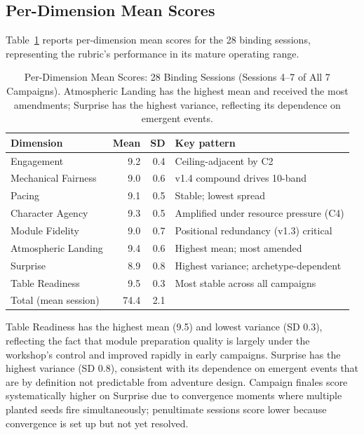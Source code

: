 \subsection{Per-Dimension Mean Scores}

Table~\ref{tab:dimension-means} reports per-dimension mean scores for the 28 binding
sessions, representing the rubric's performance in its mature operating range.

\begin{table}[t]
\caption{Per-Dimension Mean Scores: 28 Binding Sessions (Sessions 4--7 of All 7 Campaigns).
  Atmospheric Landing has the highest mean and received the most amendments;
  Surprise has the highest variance, reflecting its dependence on emergent events.}
\label{tab:dimension-means}
\begin{tabular}{@{}lrrl@{}}
\toprule
Dimension & Mean & SD & Key pattern \\
\midrule
Engagement           & 9.2 & 0.4 & Ceiling-adjacent by C2 \\
Mechanical Fairness  & 9.0 & 0.6 & v1.4 compound drives 10-band \\
Pacing               & 9.1 & 0.5 & Stable; lowest spread \\
Character Agency     & 9.3 & 0.5 & Amplified under resource pressure (C4) \\
Module Fidelity      & 9.0 & 0.7 & Positional redundancy (v1.3) critical \\
Atmospheric Landing  & 9.4 & 0.6 & Highest mean; most amended \\
Surprise             & 8.9 & 0.8 & Highest variance; archetype-dependent \\
Table Readiness      & 9.5 & 0.3 & Most stable across all campaigns \\
\midrule
Total (mean session) & 74.4 & 2.1 & \\
\bottomrule
\end{tabular}
\end{table}

Table Readiness has the highest mean (9.5) and lowest variance (SD 0.3), reflecting
the fact that module preparation quality is largely under the workshop's control and
improved rapidly in early campaigns. Surprise has the highest variance (SD 0.8),
consistent with its dependence on emergent events that are by definition not predictable
from adventure design. Campaign finales score systematically higher on Surprise due to
convergence moments where multiple planted seeds fire simultaneously; penultimate
sessions score lower because convergence is set up but not yet resolved.

